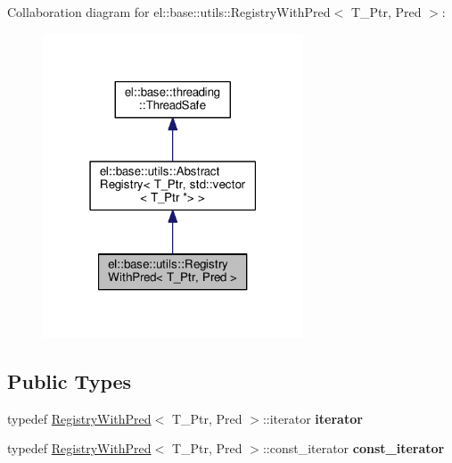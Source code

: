 Collaboration diagram for el\+:\+:base\+:\+:utils\+:\+:Registry\+With\+Pred$<$ T\+\_\+\+Ptr, Pred $>$\+:
\nopagebreak
\begin{figure}[H]
\begin{center}
\leavevmode
\includegraphics[width=219pt]{classel_1_1base_1_1utils_1_1_registry_with_pred__coll__graph}
\end{center}
\end{figure}
\subsection*{Public Types}
\begin{DoxyCompactItemize}
\item 
\mbox{\label{classel_1_1base_1_1utils_1_1_registry_with_pred_afc03d2d0a72f5ebf03e1e3b37bd9932d}} 
typedef \hyperlink{classel_1_1base_1_1utils_1_1_registry_with_pred}{Registry\+With\+Pred}$<$ T\+\_\+\+Ptr, Pred $>$\+::iterator {\bfseries iterator}
\item 
\mbox{\label{classel_1_1base_1_1utils_1_1_registry_with_pred_ad9af7a8eeedd58a75eb70bccb334f6dc}} 
typedef \hyperlink{classel_1_1base_1_1utils_1_1_registry_with_pred}{Registry\+With\+Pred}$<$ T\+\_\+\+Ptr, Pred $>$\+::const\+\_\+iterator {\bfseries const\+\_\+iterator}
\end{DoxyCompactItemize}
